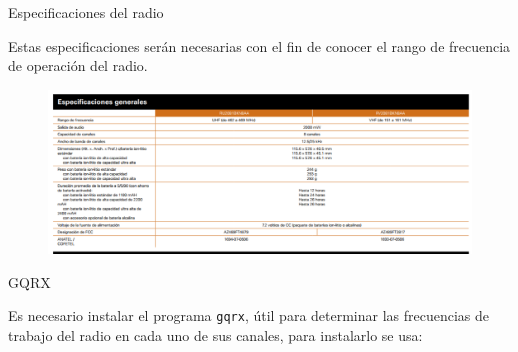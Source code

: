 \begin{frame}{Especificaciones del radio}

Estas especificaciones serán necesarias con el fin de conocer el rango de frecuencia de operación del radio\cite{FichaTecnica}.

\begin{figure}[H]
\centering
\vspace{-3mm}
\includegraphics[width=\textwidth]{parte3/lab10/pdf/lab10_3.pdf}
\end{figure}

\end{frame}

\begin{frame}{GQRX}

Es necesario instalar el programa \texttt{gqrx}, útil para determinar las frecuencias de trabajo del radio en cada uno de sus canales, para instalarlo se usa:


\end{frame}

